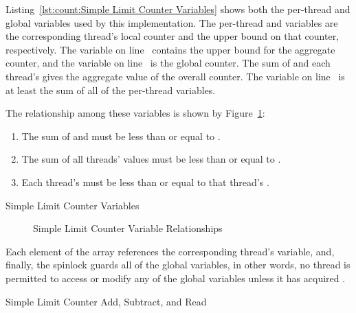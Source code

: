 \begin{fcvref}
Listing~\ref{lst:count:Simple Limit Counter Variables}
shows both the per-thread and global variables used by this
implementation.
The per-thread  and  variables are the
corresponding thread's local counter and the upper bound on that
counter, respectively.
The  variable on
line~ contains the upper
bound for the aggregate counter, and the  variable
on line~ is the global counter.
The sum of  and each thread's  gives
the aggregate value of the overall counter.
The  variable on
line~ is at least the sum of all of the
per-thread  variables.
\end{fcvref}
The relationship among these variables is shown by
Figure~\ref{fig:count:Simple Limit Counter Variable Relationships}:
\begin{enumerate}
\item	The sum of  and  must
	be less than or equal to .
\item	The sum of all threads'  values must be
	less than or equal to .
\item	Each thread's  must be less than or equal to
	that thread's .
\end{enumerate}

\begin{listing}[tbp]

\caption{Simple Limit Counter Variables}
\label{lst:count:Simple Limit Counter Variables}
\end{listing}

\begin{figure}[tb]
\centering
{}
\caption{Simple Limit Counter Variable Relationships}
\label{fig:count:Simple Limit Counter Variable Relationships}
\end{figure}

Each element of the  array references the corresponding
thread's  variable, and, finally, the 
spinlock guards all of the global variables, in other words, no thread
is permitted to access or modify any of the global variables unless it
has acquired .

\begin{listing}[tbp]

\caption{Simple Limit Counter Add, Subtract, and Read}
\label{lst:count:Simple Limit Counter Add; Subtract; and Read}
\end{listing}

